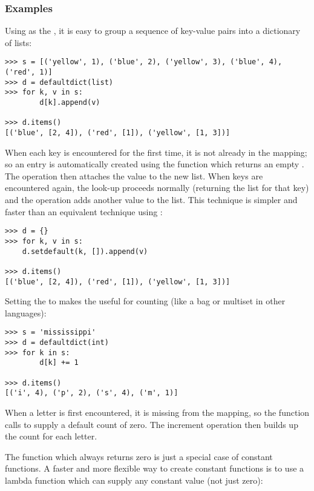 \subsubsection{ Examples \label{defaultdict-examples}}

Using  as the , it is easy to group
a sequence of key-value pairs into a dictionary of lists:

\begin{verbatim}
>>> s = [('yellow', 1), ('blue', 2), ('yellow', 3), ('blue', 4), ('red', 1)]
>>> d = defaultdict(list)
>>> for k, v in s:
        d[k].append(v)

>>> d.items()
[('blue', [2, 4]), ('red', [1]), ('yellow', [1, 3])]
\end{verbatim}

When each key is encountered for the first time, it is not already in the
mapping; so an entry is automatically created using the
 function which returns an empty .  The
 operation then attaches the value to the new list.  When
keys are encountered again, the look-up proceeds normally (returning the list
for that key) and the  operation adds another value to
the list. This technique is simpler and faster than an equivalent technique
using :

\begin{verbatim}
>>> d = {}
>>> for k, v in s:
	d.setdefault(k, []).append(v)

>>> d.items()
[('blue', [2, 4]), ('red', [1]), ('yellow', [1, 3])]
\end{verbatim}

Setting the  to  makes the
 useful for counting (like a bag or multiset in other
languages):

\begin{verbatim}
>>> s = 'mississippi'
>>> d = defaultdict(int)
>>> for k in s:
        d[k] += 1

>>> d.items()
[('i', 4), ('p', 2), ('s', 4), ('m', 1)]
\end{verbatim}

When a letter is first encountered, it is missing from the mapping, so the
 function calls  to supply a default
count of zero.  The increment operation then builds up the count for each
letter.

The function  which always returns zero is just a special
case of constant functions.  A faster and more flexible way to create
constant functions is to use a lambda function which can supply
any constant value (not just zero):

